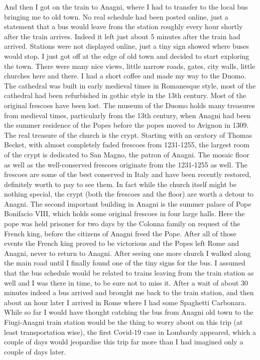 And then I got on the train to Anagni, where I had to transfer to the local bus bringing me to old town. No real schedule had been posted online, just a statement that a bus would leave from the station roughly every hour shortly after the train arrives. Indeed it left just about 5 minutes after the train had arrived. Stations were not displayed online, just a tiny sign showed where buses would stop. I just got off at the edge of old town and decided to start exploring the town. There were many nice views, little narrow roads, gates, city walls, little churches here and there. I had a short coffee and made my way to the Duomo. The cathedral was built in early medieval times in Romanesque style, most of the cathedral had been refurbished in gothic style in the 13th century. Most of the original frescoes have been lost. The museum of the Duomo holds many treasures from medieval times, particularly from the 13th century, when Anagni had been the summer residence of the Popes before the popes moved to Avignon in 1309. The real treasure of the church is the crypt. Starting with an oratory of Thomas Becket, with almost completely faded frescoes from 1231-1255, the largest room of the crypt is dedicated to San Magno, the patron of Anagni. The mosaic floor as well as the well-conserved frescoes originate from the 1231-1255 as well. The frescoes are some of the best conserved in Italy and have been recently restored, definitely worth to pay to see them. In fact while the church itself might be nothing special, the crypt (both the frescoes and the floor) are worth a detour to Anagni. The second important building in Anagni is the summer palace of Pope Bonifacio VIII, which holds some original frescoes in four large halls. Here the pope was held prisoner for two days by the Colonna family on request of the French king, before the citizens of Anagni freed the Pope. After all of those events the French king proved to be victorious and the Popes left Rome and Anagni, never to return to Anagni. After seeing one more church I walked along the main road until I finally found one of the tiny signs for the bus. I assumed that the bus schedule would be related to trains leaving from the train station as well and I was there in time, to be sure not to miss it. After a wait of about 30 minutes indeed a bus arrived and brought me back to the train station, and then about an hour later I arrived in Rome where I had some Spaghetti Carbonara.\\

While so far I would have thought catching the bus from Anagni old town to the Fiugi-Anagni train station would be the thing to worry about on this trip (at least transportation wise), the first Covid-19 case in Lombardy appeared, which a couple of days would jeopardise this trip far more than I had imagined only a couple of days later.\\

